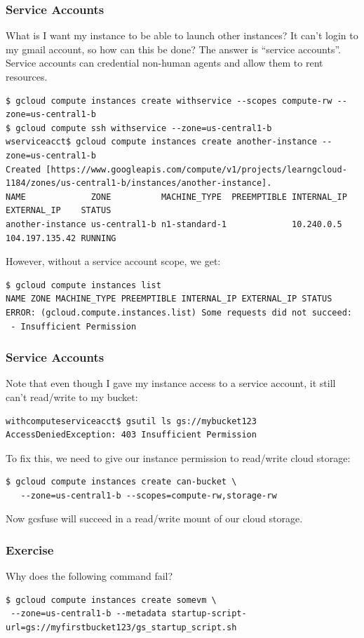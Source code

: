 \documentclass[9pt]{beamer}
\begin{document}
\begin{frame}[fragile]
\frametitle{Service Accounts}
What is I want my instance to be able to launch other instances? It can't login to my gmail account, so how can this be done? The answer is ``service accounts''. Service accounts can credential non-human agents and allow them to rent resources.
\begin{verbatim}
$ gcloud compute instances create withservice --scopes compute-rw --zone=us-central1-b
$ gcloud compute ssh withservice --zone=us-central1-b
wserviceacct$ gcloud compute instances create another-instance --zone=us-central1-b
Created [https://www.googleapis.com/compute/v1/projects/learngcloud-1184/zones/us-central1-b/instances/another-instance].
NAME             ZONE          MACHINE_TYPE  PREEMPTIBLE INTERNAL_IP EXTERNAL_IP    STATUS
another-instance us-central1-b n1-standard-1             10.240.0.5  104.197.135.42 RUNNING
\end{verbatim}
However, without a service account scope, we get:
\begin{verbatim}
$ gcloud compute instances list
NAME ZONE MACHINE_TYPE PREEMPTIBLE INTERNAL_IP EXTERNAL_IP STATUS
ERROR: (gcloud.compute.instances.list) Some requests did not succeed:
 - Insufficient Permission
\end{verbatim}
\end{frame}

\begin{frame}[fragile]
\frametitle{Service Accounts}
Note that even though I gave my instance access to a service account, it still can't read/write to my bucket:
\begin{verbatim}
withcomputeserviceacct$ gsutil ls gs://mybucket123
AccessDeniedException: 403 Insufficient Permission
\end{verbatim}
To fix this, we need to give our instance permission to read/write cloud storage:
\begin{verbatim}
$ gcloud compute instances create can-bucket \
   --zone=us-central1-b --scopes=compute-rw,storage-rw
\end{verbatim}
Now gcsfuse will succeed in a read/write mount of our cloud storage.
\end{frame}

\begin{frame}[fragile]
\frametitle{Exercise}
Why does the following command fail?
\begin{verbatim}
$ gcloud compute instances create somevm \
 --zone=us-central1-b --metadata startup-script-url=gs://myfirstbucket123/gs_startup_script.sh
\end{verbatim}
\end{frame}
\end{document}
